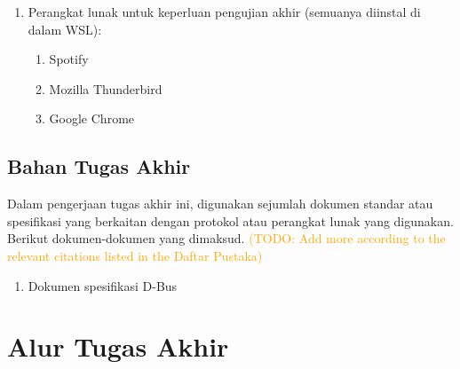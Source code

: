 \begin{enumerate}
    \item Perangkat lunak untuk keperluan pengujian akhir (semuanya diinstal di dalam WSL):
    \begin{enumerate}
        \item Spotify
        \item Mozilla Thunderbird
        \item Google Chrome
    \end{enumerate}
\end{enumerate}

\subsection{Bahan Tugas Akhir}

Dalam pengerjaan tugas akhir ini, digunakan sejumlah dokumen standar atau spesifikasi yang berkaitan dengan protokol atau perangkat lunak yang digunakan. Berikut dokumen-dokumen yang dimaksud. \textcolor{orange}{(TODO: Add more according to the relevant citations listed in the Daftar Pustaka)}
\begin{enumerate}
    \item Dokumen spesifikasi D-Bus \cite{dbus-specification}
\end{enumerate}

\section{Alur Tugas Akhir}

